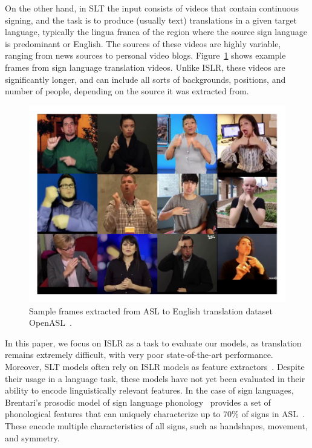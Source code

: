On the other hand, in SLT the input consists of videos that contain continuous signing, and the task is to produce (usually text) translations in a given target language, typically the lingua franca of the region where the source sign language is predominant or English. The sources of these videos are highly variable, ranging from news sources to personal video blogs. Figure~\ref{fig:oasl-samples} shows example frames from sign language translation videos. Unlike ISLR, these videos are significantly longer, and can include all sorts of backgrounds, positions, and number of people, depending on the source it was extracted from.

\begin{figure}
    \centering
    \includegraphics[width=\linewidth]{figures/oasl-samples.pdf}
    \caption{Sample frames extracted from ASL to English translation dataset OpenASL~\cite{Shi2022OpenASL}.}
    \label{fig:oasl-samples}
\end{figure}

In this paper, we focus on ISLR as a task to evaluate our models, as translation remains extremely difficult, with very poor state-of-the-art performance. Moreover, SLT models often rely on ISLR models as feature extractors~\cite{chen2022simple,muller2022findings,shi2022ttic}. Despite their usage in a language task, these models have not yet been evaluated in their ability to encode linguistically relevant features. In the case of sign languages, Brentari's prosodic model of sign language phonology~\cite{brentari1998prosodic} provides a set of phonological features that can uniquely characterize up to 70\% of signs in ASL~\cite{sehyr2021asllex}. These encode multiple characteristics of all signs, such as handshapes, movement, and symmetry.

